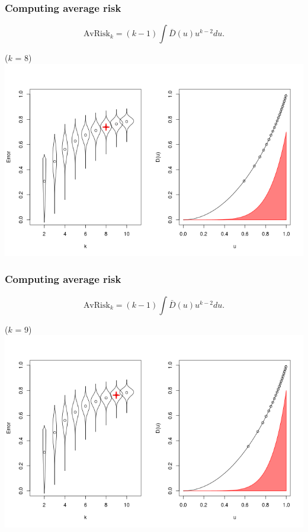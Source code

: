 \documentclass{beamer}
\begin{document}
\begin{frame}
\frametitle{Computing average risk}
\[
\text{AvRisk}_k = (k-1) \int \bar{D}(u) u^{k-2} du.
\]
\begin{center}
($k$ = 8)
\includegraphics[scale = 0.4, clip=true, trim=0 0.1in 0 0.7in]{../extrapolation/rho_0_7_fmla8.png}
\end{center}
\end{frame}

\begin{frame}
\frametitle{Computing average risk}
\[
\text{AvRisk}_k = (k-1) \int \bar{D}(u) u^{k-2} du.
\]
\begin{center}
($k$ = 9)
\includegraphics[scale = 0.4, clip=true, trim=0 0.1in 0 0.7in]{../extrapolation/rho_0_7_fmla9.png}
\end{center}
\end{frame}
\end{document}
